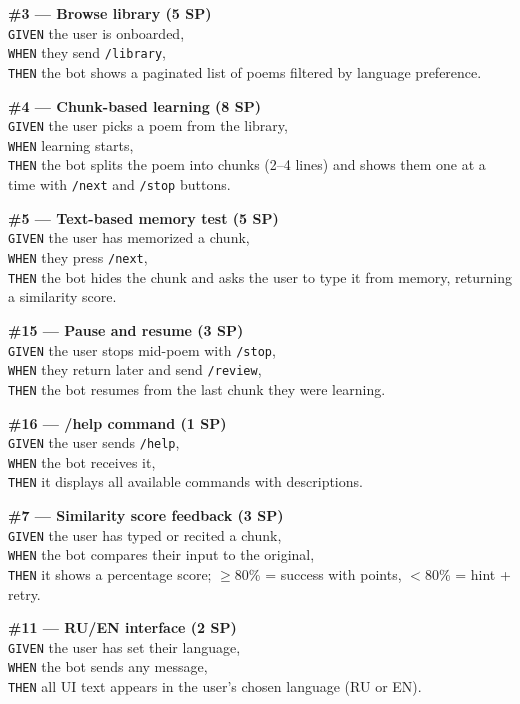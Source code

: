 \documentclass[11pt, a4paper]{article}
\begin{document}
\textbf{\#3 --- Browse library (5 SP)}\\
\texttt{GIVEN} the user is onboarded,\\
\texttt{WHEN} they send \texttt{/library},\\
\texttt{THEN} the bot shows a paginated list of poems filtered by language preference.

\textbf{\#4 --- Chunk-based learning (8 SP)}\\
\texttt{GIVEN} the user picks a poem from the library,\\
\texttt{WHEN} learning starts,\\
\texttt{THEN} the bot splits the poem into chunks (2--4 lines) and shows them one at a time with \texttt{/next} and \texttt{/stop} buttons.

\textbf{\#5 --- Text-based memory test (5 SP)}\\
\texttt{GIVEN} the user has memorized a chunk,\\
\texttt{WHEN} they press \texttt{/next},\\
\texttt{THEN} the bot hides the chunk and asks the user to type it from memory, returning a similarity score.

\textbf{\#15 --- Pause and resume (3 SP)}\\
\texttt{GIVEN} the user stops mid-poem with \texttt{/stop},\\
\texttt{WHEN} they return later and send \texttt{/review},\\
\texttt{THEN} the bot resumes from the last chunk they were learning.

\textbf{\#16 --- /help command (1 SP)}\\
\texttt{GIVEN} the user sends \texttt{/help},\\
\texttt{WHEN} the bot receives it,\\
\texttt{THEN} it displays all available commands with descriptions.

\textbf{\#7 --- Similarity score feedback (3 SP)}\\
\texttt{GIVEN} the user has typed or recited a chunk,\\
\texttt{WHEN} the bot compares their input to the original,\\
\texttt{THEN} it shows a percentage score; $\geq$80\% = success with points, $<$80\% = hint + retry.

\textbf{\#11 --- RU/EN interface (2 SP)}\\
\texttt{GIVEN} the user has set their language,\\
\texttt{WHEN} the bot sends any message,\\
\texttt{THEN} all UI text appears in the user's chosen language (RU or EN).
\end{document}
